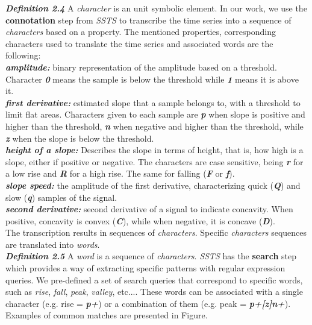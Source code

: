 \textit{\textbf{Definition 2.4}} A \textit{character} is an unit symbolic element. In our work, we use the \textbf{connotation} step from \textit{SSTS} to transcribe the time series into a sequence of \textit{characters} based on a property. The mentioned properties, corresponding characters used to translate the time series and associated words are the following:\\
\textbf{\textit{amplitude:}} binary representation of the amplitude based on a threshold. Character \textbf{\textit{0}} means the sample is below the threshold while \textbf{\textit{1}} means it is above it.\\
\textbf{\textit{first derivative:}} estimated slope that a sample belongs to, with a threshold to limit flat areas. Characters given to each sample are \textbf{\textit{p}} when slope is positive and higher than the threshold, \textit{\textbf{n}} when negative and higher than the threshold, while \textbf{\textit{z}} when the slope is below the threshold.\\
\textbf{\textit{height of a slope:}} Describes the slope in terms of height, that is, how high is a slope, either if positive or negative. The characters are case sensitive, being \textbf{\textit{r}} for a low rise and \textit{\textbf{R}} for a high rise. The same for falling (\textbf{\textit{F}} or \textbf{\textit{f}}).\\
\textbf{\textit{slope speed:}} the amplitude of the first derivative, characterizing quick (\textbf{\textit{Q}}) and slow (\textbf{\textit{q}}) samples of the signal.\\
\textbf{\textit{second derivative:}} second derivative of a signal to indicate concavity. When positive, concavity is convex (\textit{\textbf{C}}), while when negative, it is concave (\textbf{\textit{D}}).\\


The transcription results in sequences of \textit{characters}. Specific \textit{characters} sequences are translated into \textit{words}.\\

\textit{\textbf{Definition 2.5}} A \textit{word} is a sequence of \textit{characters}. \textit{SSTS} has the \textbf{search} step which provides a way of extracting specific patterns with regular expression queries. We pre-defined a set of search queries that correspond to specific words, such as \textit{rise}, \textit{fall}, \textit{peak}, \textit{valley}, etc.... These words can be associated with a single character (e.g. rise = \textbf{\textit{p+}}) or a combination of them (e.g. peak = \textbf{\textit{p+[z]n+}}). Examples of common matches are presented in Figure.

